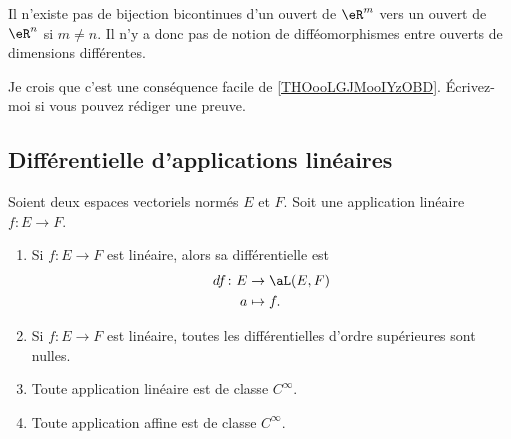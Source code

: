 \begin{remark}  %
	Il n'existe pas de bijection bicontinues d'un ouvert de \( \eR^m\) vers un ouvert de \( \eR^n\) si \( m\neq n\). Il n'y a donc pas de notion de difféomorphismes entre ouverts de dimensions différentes.

	Je crois que c'est une conséquence facile de \ref{THOooLGJMooIYzOBD}. Écrivez-moi si vous pouvez rédiger une preuve.
\end{remark}



\subsection{Différentielle d'applications linéaires}

\begin{lemma}       \label{LEMooZSNMooCfjzOB}
	Soient deux espaces vectoriels normés \( E\) et \( F\). Soit une application linéaire \( f\colon E\to F\).
	\begin{enumerate}
		\item
		      Si \( f\colon E\to F\) est linéaire, alors sa différentielle est
		      \begin{equation}
			      \begin{aligned}
				      df\colon E & \to  \aL(E,F) \\
				      a          & \mapsto f.
			      \end{aligned}
		      \end{equation}
		\item
		      Si \( f\colon E\to F\) est linéaire, toutes les différentielles d'ordre supérieures sont nulles.
		\item
		      Toute application linéaire est de classe \(  C^{\infty}\).
		\item
		      Toute application affine est de classe \(  C^{\infty}\).
	\end{enumerate}
\end{lemma}

